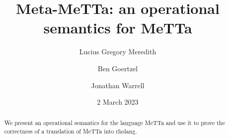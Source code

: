 \def\lastname{Meredith}

\title{Meta-MeTTa: an operational semantics for MeTTa}

\date{2 March 2023}

\author{ Lucius Gregory Meredith \\
         \and 
         Ben Goertzel
         \and Jonathan Warrell
}
 

\maketitle              %


\begin{abstract}

  We present an operational semantics for the language MeTTa and use it to prove the correctness of a translation of MeTTa into rholang.

\end{abstract}



